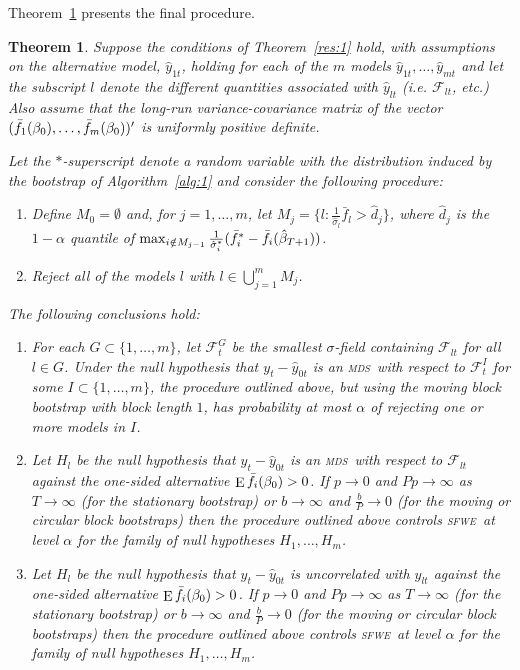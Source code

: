 \documentclass[11pt,fleqn]{article}
\newtheorem{thm}{Theorem}
\theoremstyle{definition}
\DeclareMathOperator{\E}{E}
\newcommand{\btrue}[1][]{\if#1*\hat\beta_{T+1}\else\beta_0\fi}
\newcommand{\mds}{\textsc{mds}}
\newcommand{\sfwe}{\textsc{sfwe}}
\begin{document}
Theorem~\ref{res:2} presents the final procedure.

\begin{thm}\label{res:2}
  Suppose the conditions of Theorem~\ref{res:1} hold, with assumptions
  on the alternative model, $\hat{y}_{1t}$, holding for each of the
  $m$ models $\hat{y}_{1t}, \dots, \hat{y}_{mt}$ and let the subscript
  $l$ denote the different quantities associated with $\hat{y}_{lt}$
  (i.e. $\mathcal{F}_{lt}$, etc.)  Also assume that the long-run
  variance-covariance matrix of the vector
  $(\bar{f}_1(\btrue),\dots,\bar{f}_m(\btrue))'$ is uniformly
  positive definite.

  Let the $*$-superscript denote a random variable with the
  distribution induced by the bootstrap of Algorithm~\ref{alg:1} and
  consider the following procedure:
  \begin{enumerate}
  \item Define $M_0 = \emptyset$ and, for $j = 1,\dots,m$, let $M_j =
    \{l : \tfrac1{\hat\sigma_l} \bar{f}_{l} > \hat{d}_j\}$, where
    $\hat{d}_j$ is the $1-\alpha$ quantile of $\max_{i \notin M_{j-1}}
    \tfrac{1}{\hat{\sigma}_i^{*}}(\bar{f}_{i}^{*} -
    \bar{f_i}(\btrue[*]))$.
  \item Reject all of the models $l$ with $l \in \bigcup_{j=1}^m M_j$.
  \end{enumerate}
  The following conclusions hold:
  \begin{enumerate}
  \item\label{it:1} For each $G \subset \{1,\dots,m\}$, let
    $\mathcal{F}_t^G$ be the smallest $\sigma$-field containing
    $\mathcal{F}_{lt}$ for all $l \in G$.  Under the null hypothesis
    that $y_t - \hat{y}_{0t}$ is an \mds\ with respect to
    $\mathcal{F}_t^I$ for some $I \subset \{1,\dots,m\}$, the
    procedure outlined above, but using the moving block bootstrap
    with block length $1$, has probability at most $\alpha$ of
    rejecting one or more models in $I$.
  \item\label{it:2} Let $H_l$ be the null hypothesis that $y_t -
    \hat{y}_{0t}$ is an \mds\ with respect to
    $\mathcal{F}_{lt}$ against the one-sided alternative $\E \bar
    f_i(\btrue) > 0$.  If $p \to 0$ and $P p \to \infty$ as $T \to
    \infty$ (for the stationary bootstrap) or $b \to \infty$ and
    $\frac{b}{P} \to 0$ (for the moving or circular block bootstraps)
    then the procedure outlined above controls \sfwe\ at level
    $\alpha$ for the family of null hypotheses $H_1,\dots,H_m$.
  \item\label{it:3} Let $H_l$ be the null hypothesis that $y_t -
    \hat{y}_{0t}$ is uncorrelated with $\hat{y}_{lt}$ against the
    one-sided alternative $\E \bar f_i(\btrue) > 0$.  If $p \to 0$
    and $P p \to \infty$ as $T \to \infty$ (for the stationary
    bootstrap) or $b \to \infty$ and $\frac{b}{P} \to 0$ (for the
    moving or circular block bootstraps) then the procedure outlined
    above controls \sfwe\ at level $\alpha$ for the family of
    null hypotheses $H_1,\dots,H_m$.
  \end{enumerate}
\end{thm}
\end{document}
